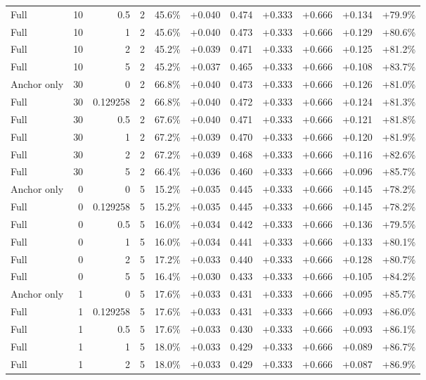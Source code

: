 \begin{table}[htbp]
\begin{tabular}{lrrrccccccc}
Full & 10 & 0.5 & 2 & 45.6\% & +0.040 & 0.474 & +0.333 & +0.666 & +0.134 & +79.9\% \\
Full & 10 & 1 & 2 & 45.6\% & +0.040 & 0.473 & +0.333 & +0.666 & +0.129 & +80.6\% \\
Full & 10 & 2 & 2 & 45.2\% & +0.039 & 0.471 & +0.333 & +0.666 & +0.125 & +81.2\% \\
Full & 10 & 5 & 2 & 45.2\% & +0.037 & 0.465 & +0.333 & +0.666 & +0.108 & +83.7\% \\
Anchor only & 30 & 0 & 2 & 66.8\% & +0.040 & 0.473 & +0.333 & +0.666 & +0.126 & +81.0\% \\
Full & 30 & 0.129258 & 2 & 66.8\% & +0.040 & 0.472 & +0.333 & +0.666 & +0.124 & +81.3\% \\
Full & 30 & 0.5 & 2 & 67.6\% & +0.040 & 0.471 & +0.333 & +0.666 & +0.121 & +81.8\% \\
Full & 30 & 1 & 2 & 67.2\% & +0.039 & 0.470 & +0.333 & +0.666 & +0.120 & +81.9\% \\
Full & 30 & 2 & 2 & 67.2\% & +0.039 & 0.468 & +0.333 & +0.666 & +0.116 & +82.6\% \\
Full & 30 & 5 & 2 & 66.4\% & +0.036 & 0.460 & +0.333 & +0.666 & +0.096 & +85.7\% \\
Anchor only & 0 & 0 & 5 & 15.2\% & +0.035 & 0.445 & +0.333 & +0.666 & +0.145 & +78.2\% \\
Full & 0 & 0.129258 & 5 & 15.2\% & +0.035 & 0.445 & +0.333 & +0.666 & +0.145 & +78.2\% \\
Full & 0 & 0.5 & 5 & 16.0\% & +0.034 & 0.442 & +0.333 & +0.666 & +0.136 & +79.5\% \\
Full & 0 & 1 & 5 & 16.0\% & +0.034 & 0.441 & +0.333 & +0.666 & +0.133 & +80.1\% \\
Full & 0 & 2 & 5 & 17.2\% & +0.033 & 0.440 & +0.333 & +0.666 & +0.128 & +80.7\% \\
Full & 0 & 5 & 5 & 16.4\% & +0.030 & 0.433 & +0.333 & +0.666 & +0.105 & +84.2\% \\
Anchor only & 1 & 0 & 5 & 17.6\% & +0.033 & 0.431 & +0.333 & +0.666 & +0.095 & +85.7\% \\
Full & 1 & 0.129258 & 5 & 17.6\% & +0.033 & 0.431 & +0.333 & +0.666 & +0.093 & +86.0\% \\
Full & 1 & 0.5 & 5 & 17.6\% & +0.033 & 0.430 & +0.333 & +0.666 & +0.093 & +86.1\% \\
Full & 1 & 1 & 5 & 18.0\% & +0.033 & 0.429 & +0.333 & +0.666 & +0.089 & +86.7\% \\
Full & 1 & 2 & 5 & 18.0\% & +0.033 & 0.429 & +0.333 & +0.666 & +0.087 & +86.9\% \\

\end{tabular}
\end{table}
